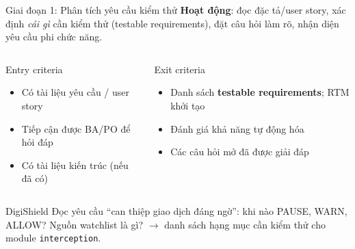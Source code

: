 \documentclass[aspectratio=169,12pt]{beamer}
\begin{document}
\begin{frame}{Giai đoạn 1: Phân tích yêu cầu kiểm thử}
  \vspace*{-0.2em}
  \textbf{Hoạt động}: đọc đặc tả/user story, xác định \textit{cái gì} cần kiểm thử
  (testable requirements), đặt câu hỏi làm rõ, nhận diện yêu cầu phi chức năng.

  \vspace{0.2em}
  \begin{columns}[T]
    \begin{block}{Entry criteria}
      \begin{itemize}
        \item Có tài liệu yêu cầu / user story
        \item Tiếp cận được BA/PO để hỏi đáp
        \item Có tài liệu kiến trúc (nếu đã có)
      \end{itemize}
    \end{block}
    \begin{block}{Exit criteria}
      \begin{itemize}
        \item Danh sách \textbf{testable requirements}; RTM khởi tạo
        \item Đánh giá khả năng tự động hóa
        \item Các câu hỏi mở đã được giải đáp
      \end{itemize}
    \end{block}
  \end{columns}

  \vspace{0.1em}
  \begin{exampleblock}{\small DigiShield}
    \small Đọc yêu cầu ``can thiệp giao dịch đáng ngờ'': khi nào PAUSE, WARN,
    ALLOW? Nguồn watchlist là gì? $\to$ danh sách hạng mục cần kiểm thử
    cho module \texttt{interception}.
  \end{exampleblock}
\end{frame}
\end{document}
